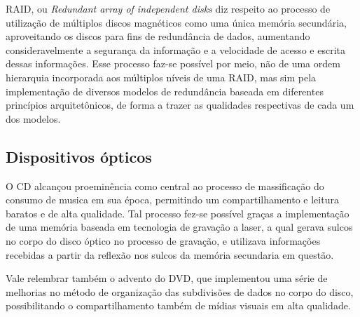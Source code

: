 \documentclass[12pt]{article}
\begin{document}
RAID, ou \textit{Redundant array of independent disks} diz respeito ao processo de utilização de múltiplos discos magnéticos como uma única memória secundária, aproveitando os discos para fins de redundância de dados, aumentando consideravelmente a segurança da informação e a velocidade de acesso e escrita dessas informações. Esse processo faz-se possível por meio, não de uma ordem hierarquia incorporada aos múltiplos níveis de uma RAID, mas sim pela implementação de diversos modelos de redundância baseada em diferentes princípios arquitetônicos, de forma a trazer as qualidades respectivas de cada um dos modelos.
\subsection{Dispositivos ópticos}
O CD alcançou proeminência como central ao processo de massificação do consumo de musica em sua época, permitindo um compartilhamento e leitura baratos e de alta qualidade. Tal processo fez-se possível graças a implementação de uma memória baseada em tecnologia de gravação a laser, a qual gerava sulcos no corpo do disco óptico no processo de gravação, e utilizava informações recebidas a partir da reflexão nos sulcos da memória secundaria em questão.

Vale relembrar também o advento do DVD, que implementou uma série de melhorias no método de organização das subdivisões de dados no corpo do disco, possibilitando o compartilhamento também de mídias visuais em alta qualidade.
\end{document}

